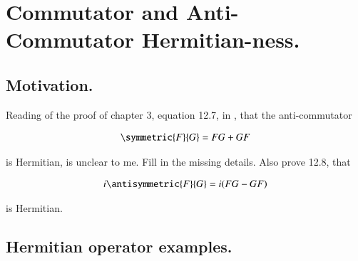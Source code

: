 
%
%




\chapter{Commutator and Anti-Commutator Hermitian-ness. }
\label{chap:commutatorHerm}
\date{ April 13, 2009.  $RCSfile: commutatorHerm.tex,v $ Last $Revision: 1.10 $ $Date: 2009/06/14 23:51:45 $ }

%



\section{Motivation. }

Reading of the proof of chapter 3, equation 12.7, in \citep{pauli2000wm},
that the anti-commutator 

\begin{align*}
\symmetric{F}{G} = {F G + G F}
\end{align*}

is Hermitian, is unclear to me.  Fill in the missing details.  Also prove 12.8, that 

\begin{align*}
i \antisymmetric{F}{G} = i (F G - G F)
\end{align*}

is Hermitian.

\section{Hermitian operator examples. }


